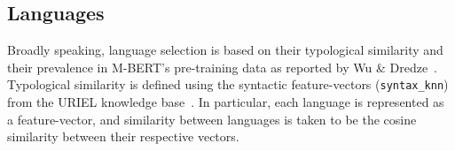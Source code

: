 



\subsection{Languages}
\label{sub:languages}
	Broadly speaking, language selection is based on their typological similarity and their prevalence in M-BERT's pre-training data as reported by Wu \& Dredze~\cite{wu-dredze-2020-languages}. Typological similarity is defined using the syntactic feature-vectors (\texttt{syntax\_knn}) from the URIEL knowledge base~\cite{littell-etal-2017-uriel}. In particular, each language is represented as a feature-vector, and similarity between languages is taken to be the cosine similarity between their respective vectors.

